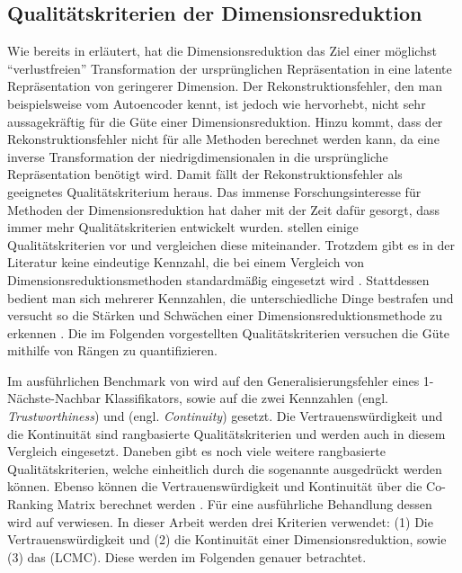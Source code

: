 \subsection{Qualitätskriterien der Dimensionsreduktion}
\label{ch:Vergleich:sec:Methodik:subsec:Qualitaetskriterien}
Wie bereits in  erläutert, hat die Dimensionsreduktion das Ziel einer möglichst \enquote{verlustfreien} Transformation der ursprünglichen Repräsentation in eine latente Repräsentation von geringerer Dimension. Der Rekonstruktionsfehler, den man beispielsweise vom Autoencoder kennt, ist jedoch wie \textcite[18]{vanderMaaten.2009} hervorhebt, nicht sehr aussagekräftig für die Güte einer Dimensionsreduktion. Hinzu kommt, dass der Rekonstruktionsfehler nicht für alle Methoden berechnet werden kann, da eine inverse Transformation der niedrigdimensionalen in die ursprüngliche Repräsentation benötigt wird. Damit fällt der Rekonstruktionsfehler als geeignetes Qualitätskriterium heraus. Das immense Forschungsinteresse für Methoden der Dimensionsreduktion hat daher mit der Zeit dafür gesorgt, dass immer mehr Qualitätskriterien entwickelt wurden. \textcite{Gracia.2014} stellen einige Qualitätskriterien vor und vergleichen diese miteinander. Trotzdem gibt es in der Literatur keine eindeutige Kennzahl, die bei einem Vergleich von Dimensionsreduktionsmethoden standardmäßig eingesetzt wird \parencite[vgl.][1 -- 2]{Lee.2009}. Stattdessen bedient man sich mehrerer Kennzahlen, die
unterschiedliche Dinge bestrafen und versucht so die Stärken und Schwächen einer
Dimensionsreduktionsmethode zu erkennen \parencite[486]{Venna.2001}. Die im Folgenden vorgestellten Qualitätskriterien versuchen die Güte
mithilfe von Rängen zu quantifizieren.

Im ausführlichen Benchmark von \textcite{vanderMaaten.2009} wird auf den Generalisierungsfehler
eines 1-Nächste-Nachbar Klassifikators, sowie auf die zwei Kennzahlen
 (engl. \textit{Trustworthiness}) und  (engl.
\textit{Continuity}) \parencites{Venna.2001}{Venna.2006} gesetzt. Die Vertrauenswürdigkeit und die Kontinuität sind
rangbasierte Qualitätskriterien und werden auch in diesem Vergleich eingesetzt. Daneben gibt es
noch viele weitere rangbasierte Qualitätskriterien, welche einheitlich durch die sogenannte
 \parencite[1432]{Lee.2009} ausgedrückt werden können. Ebenso können die Vertrauenswürdigkeit und
Kontinuität über die Co-Ranking Matrix berechnet werden \parencite[1433]{Lee.2009}. Für eine ausführliche Behandlung dessen wird auf \textcite{Lee.2009}
verwiesen. In dieser Arbeit werden drei Kriterien verwendet: (1) Die Vertrauenswürdigkeit und (2)
die Kontinuität einer Dimensionsreduktion, sowie (3) das 
(LCMC). Diese werden im Folgenden genauer betrachtet. 

